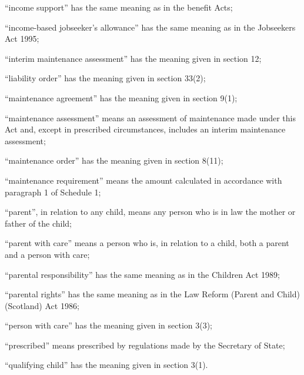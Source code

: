 \documentclass[12pt,a4paper]{article}
\begin{document}
\begin{enumerate}
    “income support” has the same meaning as in the benefit Acts;

“income-based jobseeker’s allowance” has the same meaning as in the Jobseekers Act 1995;

    “interim maintenance assessment” has the meaning given in section 12;

    “liability order” has the meaning given in section 33(2);

    “maintenance agreement” has the meaning given in section 9(1);

    “maintenance assessment” means an assessment of maintenance made under this Act and, except in prescribed circumstances, includes an interim maintenance assessment;

    “maintenance order” has the meaning given in section 8(11);

    “maintenance requirement” means the amount calculated in accordance with paragraph 1 of Schedule 1;

    “parent”, in relation to any child, means any person who is in law the mother or father of the child;

“parent with care” means a person who is, in relation to a child, both a parent and a person with care;

    “parental responsibility” has the same meaning as in the Children Act 1989;

    “parental rights” has the same meaning as in the Law Reform (Parent and Child) (Scotland) Act 1986;

    “person with care” has the meaning given in section 3(3);

    “prescribed” means prescribed by regulations made by the Secretary of State;

    “qualifying child” has the meaning given in section 3(1).
\end{enumerate}

\end{document}
